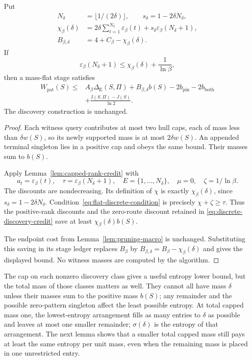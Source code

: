 \begin{lemma}\label{lem:flat-discrete-credit}
Put
\[
 \begin{aligned}
 N_\delta&=\lfloor1/(2\delta)\rfloor,\qquad
 s_\delta=1-2\delta N_\delta,\\
 \chi_\beta(\delta)
 &=2\delta\sum_{t=1}^{N_\delta}\varepsilon_\beta(t)
       +s_\delta\varepsilon_\beta(N_\delta+1),\\
 B_{\beta,\delta}&=4+C_\beta-\chi_\beta(\delta).
 \end{aligned}
\]
If
\begin{equation}\label{eq:flat-discrete-condition}
 \varepsilon_\beta(N_\delta+1)
 \le\chi_\beta(\delta)+\frac1{\ln\beta},
\end{equation}
then a mass-flat stage satisfies
\[
 \begin{aligned}
 W_{\mathrm{pat}}(S)\le{}&
 A_\beta\Delta_{\mathrm E}(S,\Pi)+B_{\beta,\delta}b(S)
       -2b_{\mathrm{pin}}-2b_{\mathrm{both}}\\
 &+\frac{I(S,\Pi)-J(S)}{\ln2}.
 \end{aligned}
\]
The discovery construction is unchanged.
\end{lemma}
\begin{proof}
Each witness query contributes at most two hull caps, each of mass
less than $\delta w(S)$, so its newly supported mass is at most
$2\delta w(S)$. An appended terminal singleton lies in a positive
cap and obeys the same bound. Their masses sum to $b(S)$.

Apply Lemma~\ref{lem:capped-rank-credit} with
\[
 a_t=\varepsilon_\beta(t),\quad
 \tau=\varepsilon_\beta(N_\delta+1),\quad
 E=\{1,\ldots,N_\delta\},\quad \mu=0,\quad
 \zeta=1/\ln\beta.
\]
The discounts are nondecreasing. Its definition of $\chi$ is exactly
$\chi_\beta(\delta)$, since $s_\delta=1-2\delta N_\delta$.
Condition~\eqref{eq:flat-discrete-condition} is precisely
$\chi+\zeta\ge\tau$. Thus the positive-rank discounts and the
zero-route discount retained in
\eqref{eq:discrete-discovery-credit} save at least
$\chi_\beta(\delta)b(S)$.

The endpoint cost from Lemma~\ref{lem:pruning-macro} is unchanged.
Substituting this saving in its stage ledger replaces
$B_\beta$ by $B_{\beta,\delta}=B_\beta-\chi_\beta(\delta)$ and gives
the displayed bound. No witness masses are computed by the algorithm.
\end{proof}

The cap on each nonzero discovery class gives a useful entropy
lower bound, but the total mass of those classes matters as well.
They cannot all have mass $\delta$ unless their masses sum to the
positive mass $b(S)$; any remainder and the possible zero-pattern
singleton affect the least possible entropy. At total capped mass
one, the lowest-entropy arrangement fills as many entries to
$\delta$ as possible and leaves at most one smaller remainder;
$\sigma(\delta)$ is the entropy of that arrangement. The next lemma
shows that a smaller total capped mass still pays at least the same
entropy per unit mass, even when the remaining mass is placed in one
unrestricted entry.

